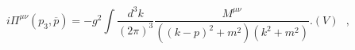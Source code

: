 \begin{equation} 
i\Pi^{\mu\nu} (p_{3},\overline p)= -g^2 \int \frac
{d^{3}k}{(2\pi)^3} \frac {{ \mathit {M} }^{\mu\nu} }{((k-p)^2 + m^2 
)(k^2 + m^2 )} . (V) ~~~, 
\end{equation}

